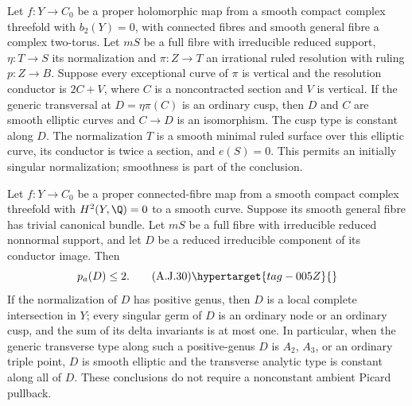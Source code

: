 
\begin{proposition}\hypertarget{tag-01BB}{}\label{cdp:st:A.5.20}


Let $f:Y\to C_0$ be a proper holomorphic map from a smooth
compact complex threefold with $b_2(Y)=0$, with connected
fibres and smooth general fibre a complex two-torus.
Let $mS$ be a full fibre with irreducible reduced support,
$\eta:T\to S$ its normalization and $\pi:Z\to T$ an
irrational ruled resolution with ruling $p:Z\to B$.
Suppose every exceptional curve of $\pi$ is vertical
and the resolution conductor is $2C+V$, where $C$
is a noncontracted section and $V$ is vertical.
If the generic transversal at $D=\eta\pi(C)$ is an
ordinary cusp, then $D$ and $C$ are smooth elliptic
curves and $C\to D$ is an isomorphism. The cusp type
is constant along $D$. The normalization $T$ is a
smooth minimal ruled surface over this elliptic curve,
its conductor is twice a section, and $e(S)=0$.
This permits an initially singular normalization;
smoothness is part of the conclusion.
\end{proposition}

\begin{proposition}\hypertarget{tag-01B4}{}\label{cdp:st:A.5.14}


Let $f:Y\to C_0$ be a proper connected-fibre map from a
smooth compact complex threefold with $H^2(Y,\Q)=0$ to
a smooth curve. Suppose its smooth general fibre has
trivial canonical bundle. Let $mS$ be a full fibre with
irreducible reduced nonnormal support, and let $D$ be
a reduced irreducible component of its conductor image.
Then
\[
                         p_a(D)\le2.                \tag{A.J.30}\hypertarget{tag-005Z}{}\label{cdp:eq:A.J.30}
\]
If the normalization of $D$ has positive genus, then
$D$ is a local complete intersection in $Y$; every
singular germ of $D$ is an ordinary node or an ordinary
cusp, and the sum of its delta invariants is at most
one. In particular, when the generic transverse type
along such a positive-genus $D$ is $A_2$, $A_3$, or an
ordinary triple point, $D$ is smooth elliptic and the
transverse analytic type is constant along all of $D$.
These conclusions do not require a nonconstant ambient
Picard pullback.
\end{proposition}

